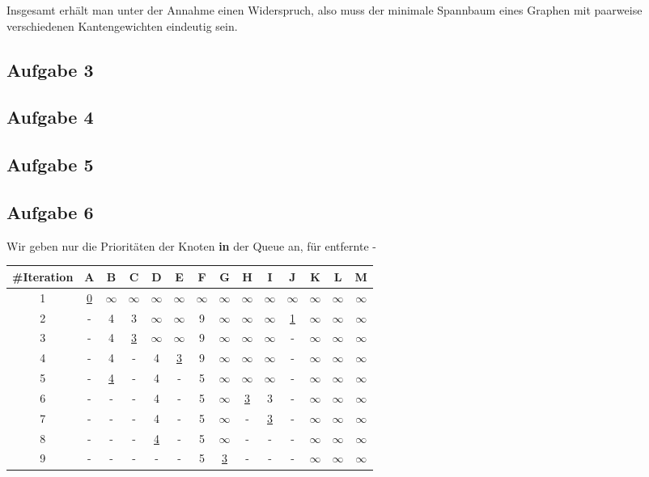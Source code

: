 \documentclass[a4paper,graphics,11pt]{article}
\newcommand{\aufgabe}[1]{\subsection*{Aufgabe #1}}
\begin{document}
Insgesamt erhält man unter der Annahme einen Widerspruch, also muss der minimale Spannbaum eines Graphen mit paarweise verschiedenen
Kantengewichten eindeutig sein.


\aufgabe{3}

\newpage

\aufgabe{4}

\newpage

\aufgabe{5}

\newpage

\aufgabe{6}

Wir geben nur die Prioritäten der Knoten \textbf{in} der Queue an, für entfernte -

\begin{tabular}{c|*{12}{c|}c}
    \#Iteration     & A     & B     & C     & D     & E     & F     & G     & H     & I     & J     & K     & L     & M\\
    \hline
    1               & \underline{0} &$\infty$&$\infty$&$\infty$&$\infty$&$\infty$&$\infty$&$\infty$&$\infty$&$\infty$&$\infty$&$\infty$&$\infty$\\
    \hline
    2               & -     & 4     & 3     &$\infty$&$\infty$& 9     &$\infty$&$\infty$&$\infty$& \underline{1}    &$\infty$&$\infty$&$\infty$\\
    \hline
    3               & -     & 4     & \underline{3} & $\infty$& $\infty$& 9     & $\infty$& $\infty$& $\infty$& -     & $\infty$& $\infty$& $\infty$\\
    \hline
    4               & -     & 4     & -     & 4     & \underline{3} & 9     & $\infty$& $\infty$& $\infty$& -     & $\infty$& $\infty$& $\infty$\\
    \hline
    5               & -     & \underline{4} & -     & 4     & -     & 5     & $\infty$& $\infty$& $\infty$& -     & $\infty$& $\infty$& $\infty$\\
    \hline
    6               & -     & -     & -     & 4     & -     & 5     & $\infty$& \underline{3} & 3     & -     & $\infty$& $\infty$& $\infty$\\
    \hline
    7               & -     & -     & -     & 4     & -     & 5     & $\infty$& -     & \underline{3} & -     & $\infty$& $\infty$& $\infty$\\
    \hline
    8               & -     & -     & -     & \underline{4} & -     & 5     & $\infty$& -     & -   & -     & $\infty$& $\infty$& $\infty$\\
    \hline
    9               & -     & -     & -     & -     & -     & 5     & \underline{3} & -     & -   & -     & $\infty$& $\infty$& $\infty$\\

\end{tabular}
\end{document}
